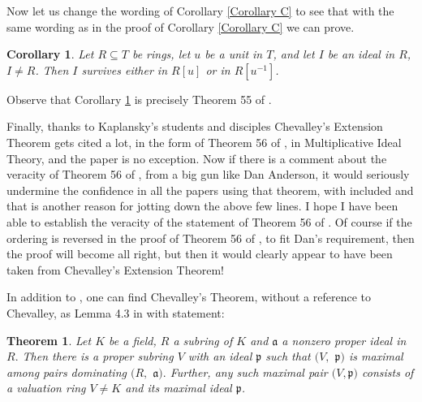 \documentclass{amsproc}
\theoremstyle{plain}
\newtheorem{corollary}{Corollary}
\newtheorem{theorem}{Theorem}
\numberwithin{equation}{section}
\begin{document}
Now let us change the wording of Corollary \ref{Corollary C} to see that
with the same wording as in the proof of Corollary \ref{Corollary C} we can
prove.

\begin{corollary}
\label{Corollary D} Let $R\subseteq T$ be rings, let $u$ be a unit in $T$,
and let $I$ be an ideal in $R$, $I\neq R$. Then $I$ survives either in $R[u]$
or in $R[u^{-1}]$.
\end{corollary}

Observe that Corollary \ref{Corollary D} is precisely Theorem 55 of \cite{K}.

Finally, thanks to Kaplansky's students and disciples Chevalley's Extension
Theorem gets cited a lot, in the form of Theorem 56 of \cite{K}, in
Multiplicative Ideal Theory, and the paper \cite{DHLZ} is no exception. Now
if there is a comment about the veracity of Theorem 56 of \cite{K}, from a
big gun like Dan Anderson, it would seriously undermine the confidence in
all the papers using that theorem, with \cite{DHLZ} included and that is
another reason for jotting down the above few lines. I hope I have been able
to establish the veracity of the statement of Theorem 56 of \cite{K}. Of
course if the ordering is reversed in the proof of Theorem 56 of \cite{K},
to fit Dan's requirement, then the proof will become all right, but then it
would clearly appear to have been taken from Chevalley's Extension Theorem!

In addition to \cite{EP}, one can find Chevalley's Theorem, without a
reference to Chevalley, as Lemma 4.3 in \cite{C A2} with statement:

\begin{theorem}
\label{Theorem E} Let $K$ be a field, $R$ a subring of $K$ and $\mathfrak{a}$
a nonzero proper ideal in $R.$ Then there is a proper subring $V$ with an
ideal $\mathfrak{p}$ such that $(V,$ $\mathfrak{p)}$ is maximal among pairs
dominating $(R,$ $\mathfrak{a}).$ Further, any such maximal pair $(V,%
\mathfrak{p)}$ consists of a valuation ring $V\neq K$ and its maximal ideal $%
\mathfrak{p}$.
\end{theorem}
\end{document}
